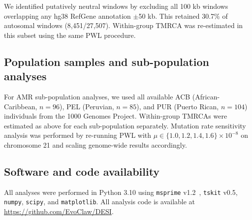 We identified putatively neutral windows by excluding all 100 kb windows overlapping any hg38 RefGene annotation $\pm$50 kb. This retained 30.7\% of autosomal windows (8,451/27,507). Within-group TMRCA was re-estimated in this subset using the same PWL procedure.

\subsection*{Population samples and sub-population analyses}

For AMR sub-population analyses, we used all available ACB (African-Caribbean, $n = 96$), PEL (Peruvian, $n = 85$), and PUR (Puerto Rican, $n = 104$) individuals from the 1000 Genomes Project. Within-group TMRCAs were estimated as above for each sub-population separately. Mutation rate sensitivity analysis was performed by re-running PWL with $\mu \in \{1.0, 1.2, 1.4, 1.6\} \times 10^{-8}$ on chromosome 21 and scaling genome-wide results accordingly.

\subsection*{Software and code availability}

All analyses were performed in Python 3.10 using \texttt{msprime} v1.2~\citep{Kelleher2016}, \texttt{tskit} v0.5, \texttt{numpy}, \texttt{scipy}, and \texttt{matplotlib}. All analysis code is available at \url{https://github.com/EvoClaw/DESI}.
